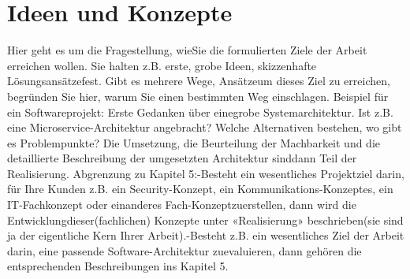 \chapter{Ideen und Konzepte}


Hier geht es um die Fragestellung, wieSie die formulierten Ziele der Arbeit erreichen wollen. Sie halten z.B. erste, grobe Ideen, skizzenhafte Lösungsansätzefest. Gibt es mehrere Wege, Ansätzeum dieses Ziel zu erreichen, begründen Sie hier, warum Sie einen bestimmten Weg einschlagen. Beispiel für ein Softwareprojekt: Erste Gedanken über einegrobe Systemarchitektur. Ist z.B. eine Microservice-Architektur angebracht? Welche Alternativen bestehen, wo gibt es Problempunkte? Die Umsetzung, die Beurteilung der Machbarkeit und die detaillierte Beschreibung der umgesetzten Architektur sinddann Teil der Realisierung. Abgrenzung zu Kapitel 5:-Besteht ein wesentliches Projektziel darin, für Ihre Kunden z.B. ein Security-Konzept, ein Kommunikations-Konzeptes, ein IT-Fachkonzept oder einanderes Fach-Konzeptzuerstellen, dann wird die Entwicklungdieser(fachlichen) Konzepte unter «Realisierung» beschrieben(sie sind ja der eigentliche Kern Ihrer Arbeit).-Besteht z.B. ein wesentliches Ziel der Arbeit darin, eine passende Software-Architektur zuevaluieren, dann gehören die entsprechenden Beschreibungen ins Kapitel 5.